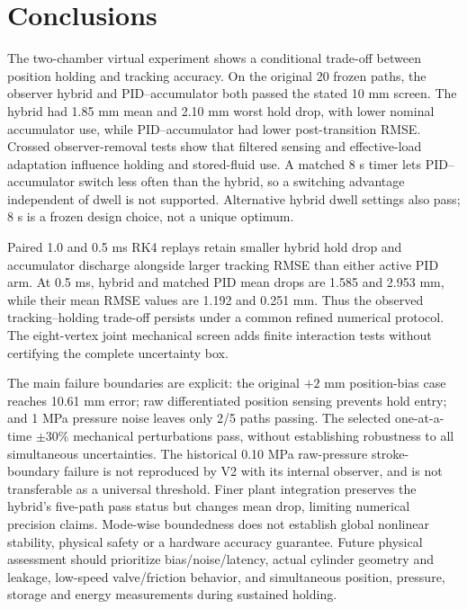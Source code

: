 \documentclass[machines,article,submit,pdftex,moreauthors]{Definitions/mdpi}
\begin{document}
\section{Conclusions}
The two-chamber virtual experiment shows a conditional trade-off between position holding and tracking accuracy. On the original 20 frozen paths, the observer hybrid and PID--accumulator both passed the stated 10 mm screen. The hybrid had 1.85 mm mean and 2.10 mm worst hold drop, with lower nominal accumulator use, while PID--accumulator had lower post-transition RMSE. Crossed observer-removal tests show that filtered sensing and effective-load adaptation influence holding and stored-fluid use. A matched 8 s timer lets PID--accumulator switch less often than the hybrid, so a switching advantage independent of dwell is not supported. Alternative hybrid dwell settings also pass; 8 s is a frozen design choice, not a unique optimum.

Paired 1.0 and 0.5 ms RK4 replays retain smaller hybrid hold drop and accumulator discharge alongside larger tracking RMSE than either active PID arm. At 0.5 ms, hybrid and matched PID mean drops are 1.585 and 2.953 mm, while their mean RMSE values are 1.192 and 0.251 mm. Thus the observed tracking--holding trade-off persists under a common refined numerical protocol. The eight-vertex joint mechanical screen adds finite interaction tests without certifying the complete uncertainty box.

The main failure boundaries are explicit: the original $+2$ mm position-bias case reaches 10.61 mm error; raw differentiated position sensing prevents hold entry; and 1 MPa pressure noise leaves only 2/5 paths passing. The selected one-at-a-time $\pm30\%$ mechanical perturbations pass, without establishing robustness to all simultaneous uncertainties. The historical 0.10 MPa raw-pressure stroke-boundary failure is not reproduced by V2 with its internal observer, and is not transferable as a universal threshold. Finer plant integration preserves the hybrid's five-path pass status but changes mean drop, limiting numerical precision claims. Mode-wise boundedness does not establish global nonlinear stability, physical safety or a hardware accuracy guarantee. Future physical assessment should prioritize bias/noise/latency, actual cylinder geometry and leakage, low-speed valve/friction behavior, and simultaneous position, pressure, storage and energy measurements during sustained holding.
\end{document}
